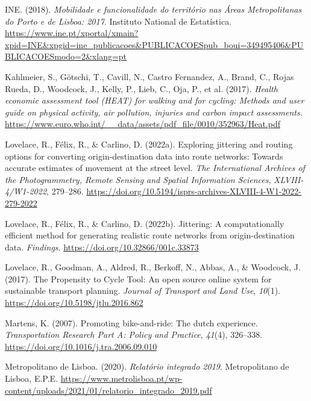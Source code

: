 \documentclass[review, doubleblind, 3p,
authoryear]{elsarticle} %
\newlength{\cslhangindent}
\newlength{\cslentryspacingunit} %
\newenvironment{CSLReferences}[2] %
 {%
  \setlength{\parindent}{0pt}
  \ifodd #1
  \let\oldpar\par
  \def\par{\hangindent=\cslhangindent\oldpar}
  \fi
  \setlength{\parskip}{#2\cslentryspacingunit}
 }%
 {}
\begin{document}
\begin{CSLReferences}{1}{0}
\leavevmode{}%
INE. (2018). \emph{Mobilidade e funcionalidade do território nas {Áreas
Metropolitanas do Porto e de Lisboa}: 2017}. {Instituto National de
Estatística}.
\url{https://www.ine.pt/xportal/xmain?xpid=INE\&xpgid=ine_publicacoes\&PUBLICACOESpub_boui=349495406\&PUBLICACOESmodo=2\&xlang=pt}

\leavevmode{}%
Kahlmeier, S., Götschi, T., Cavill, N., Castro Fernandez, A., Brand, C.,
Rojas Rueda, D., Woodcock, J., Kelly, P., Lieb, C., Oja, P., et al.
(2017). \emph{Health economic assessment tool ({HEAT}) for walking and
for cycling: Methods and user guide on physical activity, air pollution,
injuries and carbon impact assessments}.
\url{https://www.euro.who.int/__data/assets/pdf_file/0010/352963/Heat.pdf}

\leavevmode{}%
Lovelace, R., Félix, R., \& Carlino, D. (2022a). Exploring jittering and
routing options for converting origin-destination data into route
networks: Towards accurate estimates of movement at the street level.
\emph{The International Archives of the Photogrammetry, Remote Sensing
and Spatial Information Sciences}, \emph{XLVIII-4/W1-2022}, 279--286.
\url{https://doi.org/10.5194/isprs-archives-XLVIII-4-W1-2022-279-2022}

\leavevmode{}%
Lovelace, R., Félix, R., \& Carlino, D. (2022b). Jittering: A
computationally efficient method for generating realistic route networks
from origin-destination data. \emph{Findings}.
\url{https://doi.org/10.32866/001c.33873}

\leavevmode{}%
Lovelace, R., Goodman, A., Aldred, R., Berkoff, N., Abbas, A., \&
Woodcock, J. (2017). The Propensity to Cycle Tool: An open source online
system for sustainable transport planning. \emph{Journal of Transport
and Land Use}, \emph{10}(1). \url{https://doi.org/10.5198/jtlu.2016.862}

\leavevmode{}%
Martens, K. (2007). Promoting bike-and-ride: The dutch experience.
\emph{Transportation Research Part A: Policy and Practice},
\emph{41}(4), 326--338. \url{https://doi.org/10.1016/j.tra.2006.09.010}

\leavevmode{}%
Metropolitano de Lisboa. (2020). \emph{Relatório integrado 2019}.
{Metropolitano de Lisboa, E.P.E.}
\url{https://www.metrolisboa.pt/wp-content/uploads/2021/01/relatorio_integrado_2019.pdf}


\end{CSLReferences}
\end{document}
